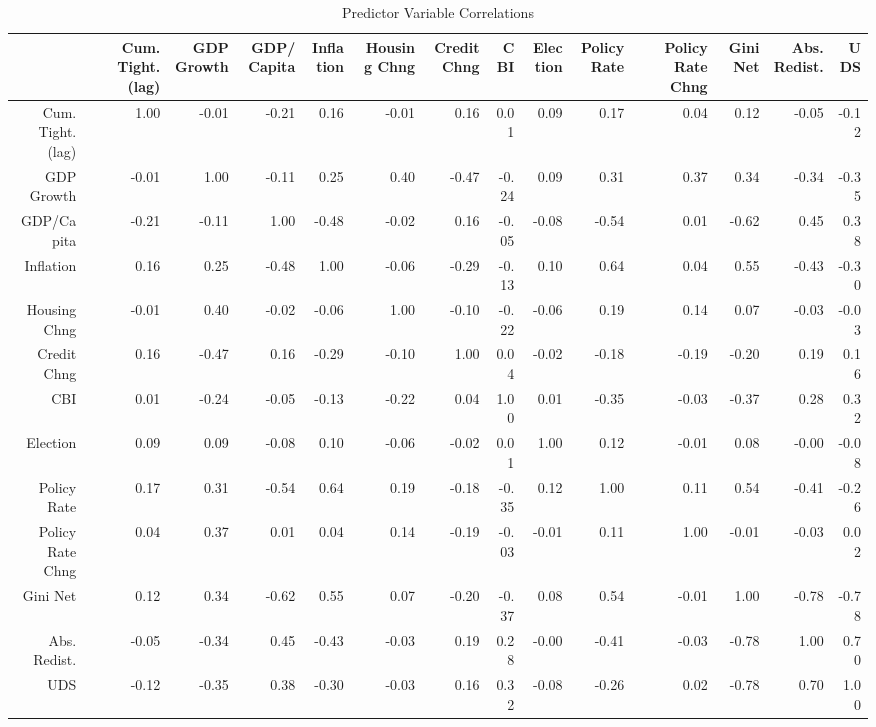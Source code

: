\begin{table}[ht]
\centering
\caption{Predictor Variable Correlations} 
\begingroup\tiny
\begin{tabular}{rrrrrrrrrrrrrr}
  \hline
 & Cum. Tight. (lag) & GDP Growth & GDP/Capita & Inflation & Housing Chng & Credit Chng & CBI & Election & Policy Rate & Policy Rate Chng & Gini Net & Abs. Redist. & UDS \\ 
  \hline
Cum. Tight. (lag) & 1.00 & -0.01 & -0.21 & 0.16 & -0.01 & 0.16 & 0.01 & 0.09 & 0.17 & 0.04 & 0.12 & -0.05 & -0.12 \\ 
  GDP Growth & -0.01 & 1.00 & -0.11 & 0.25 & 0.40 & -0.47 & -0.24 & 0.09 & 0.31 & 0.37 & 0.34 & -0.34 & -0.35 \\ 
  GDP/Capita & -0.21 & -0.11 & 1.00 & -0.48 & -0.02 & 0.16 & -0.05 & -0.08 & -0.54 & 0.01 & -0.62 & 0.45 & 0.38 \\ 
  Inflation & 0.16 & 0.25 & -0.48 & 1.00 & -0.06 & -0.29 & -0.13 & 0.10 & 0.64 & 0.04 & 0.55 & -0.43 & -0.30 \\ 
  Housing Chng & -0.01 & 0.40 & -0.02 & -0.06 & 1.00 & -0.10 & -0.22 & -0.06 & 0.19 & 0.14 & 0.07 & -0.03 & -0.03 \\ 
  Credit Chng & 0.16 & -0.47 & 0.16 & -0.29 & -0.10 & 1.00 & 0.04 & -0.02 & -0.18 & -0.19 & -0.20 & 0.19 & 0.16 \\ 
  CBI & 0.01 & -0.24 & -0.05 & -0.13 & -0.22 & 0.04 & 1.00 & 0.01 & -0.35 & -0.03 & -0.37 & 0.28 & 0.32 \\ 
  Election & 0.09 & 0.09 & -0.08 & 0.10 & -0.06 & -0.02 & 0.01 & 1.00 & 0.12 & -0.01 & 0.08 & -0.00 & -0.08 \\ 
  Policy Rate & 0.17 & 0.31 & -0.54 & 0.64 & 0.19 & -0.18 & -0.35 & 0.12 & 1.00 & 0.11 & 0.54 & -0.41 & -0.26 \\ 
  Policy Rate Chng & 0.04 & 0.37 & 0.01 & 0.04 & 0.14 & -0.19 & -0.03 & -0.01 & 0.11 & 1.00 & -0.01 & -0.03 & 0.02 \\ 
  Gini Net & 0.12 & 0.34 & -0.62 & 0.55 & 0.07 & -0.20 & -0.37 & 0.08 & 0.54 & -0.01 & 1.00 & -0.78 & -0.78 \\ 
  Abs. Redist. & -0.05 & -0.34 & 0.45 & -0.43 & -0.03 & 0.19 & 0.28 & -0.00 & -0.41 & -0.03 & -0.78 & 1.00 & 0.70 \\ 
  UDS & -0.12 & -0.35 & 0.38 & -0.30 & -0.03 & 0.16 & 0.32 & -0.08 & -0.26 & 0.02 & -0.78 & 0.70 & 1.00 \\ 
   \hline
\end{tabular}
\endgroup
\end{table}

